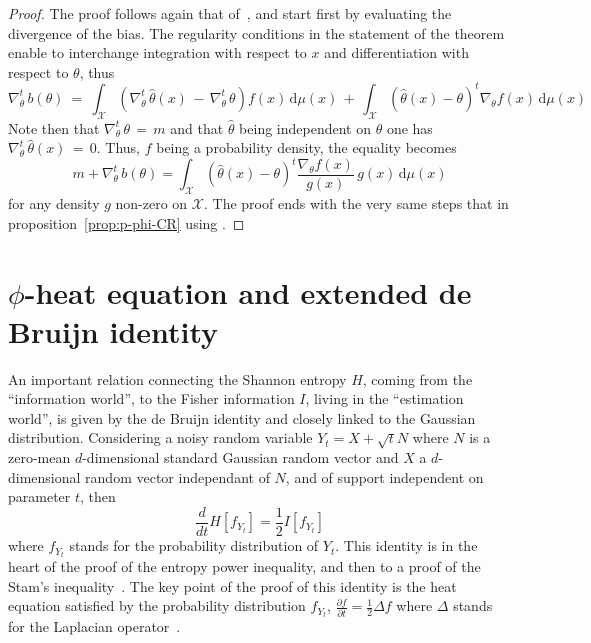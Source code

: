 \documentclass[english,sort&compress]{elsarticle}
\theoremstyle{definition}
\theoremstyle{plain}
\theoremstyle{plain}
\def\dmu{\mathrm{d}\mu}
\def\X{\mathcal{X}}
\begin{document}
\begin{proof}
  The proof  follows again that  of~\cite{Ber13}, and start first  by evaluating
  the divergence of the bias.  The regularity conditions in the statement of the
  theorem   enable  to  interchange   integration  with   respect  to   $x$  and
  differentiation with respect to $\theta$, thus
  \[
  \nabla_\theta^t  \,  b(\theta)  \:  =  \: \int_\X  \left(  \nabla_\theta^t  \,
    \widehat{\theta}(x)  \,  - \,  \nabla_\theta^t  \,  \theta  \right) f(x)  \,
  \dmu(x)  \,  +  \,  \int_\X  \left(  \widehat{\theta}(x)  -  \theta  \right)^t
  \nabla_\theta f(x) \, \dmu(x)
  \]
  Note   then  that   $\nabla_\theta^t  \,   \theta  \,   =  \,   m$   and  that
  $\widehat{\theta}$  being independent  on  $\theta$ one  has $\nabla_\theta^t  \,
  \widehat{\theta}(x) \,  = \, 0$. Thus,  $f$ being a  probability density, the
  equality becomes
  \[
  m + \nabla_\theta^t \, b(\theta) = \int_\X \left( \widehat{\theta}(x) - \theta
  \right)^t \frac{\nabla_\theta f(x)}{g(x)} \, g(x) \, \dmu(x)
  \]
  for any density $g$ non-zero on $\X$.  The proof ends with the very same steps
  that in proposition~\ref{prop:p-phi-CR} using \cite[Lemma2]{Ber13}.
\end{proof}


\section{$\phi$-heat equation and extended de Bruijn identity}
\label{sec:deBruijn}


An  important relation  connecting  the  Shannon entropy  $H$,  coming from  the
``information world'', to the Fisher information $I$, living in the ``estimation
world'', is given  by the de Bruijn identity and closely  linked to the Gaussian
distribution. Considering a  noisy random variable $Y_t = X  + \sqrt{t} N$ where
$N$ is  a zero-mean  $d$-dimensional standard Gaussian  random vector and  $X$ a
$d$-dimensional random vector independant of  $N$, and of support independent on
parameter  $t$,  then $$\frac{d}{dt}  H[f_{Y_t}]  =  \frac12 I[f_{Y_t}]$$  where
$f_{Y_t}$ stands for the probability  distribution of $Y_t$. This identity is in
the heart of the  proof of the entropy power inequality, and  then to a proof of
the  Stam's inequality~\cite{CovTho06}.   The key  point  of the  proof of  this
identity  is  the  heat  equation  satisfied  by  the  probability  distribution
$f_{Y_t}$,  $\frac{\partial f}{\partial t}  = \frac12  \Delta f$  where $\Delta$
stands for the Laplacian operator~\cite{Wid75}.
\end{document}
